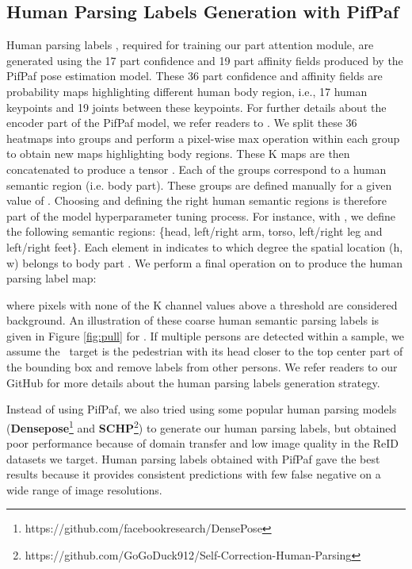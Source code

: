 \documentclass[10pt,twocolumn,letterpaper]{article}
\begin{document}
\subsection*{Human Parsing Labels Generation with PifPaf}
Human parsing labels , required for training our part attention module, are generated using the 17 part confidence and 19 part affinity fields produced by the PifPaf \cite{pifpaf} pose estimation model.
These 36 part confidence and affinity fields are probability maps highlighting different human body region, i.e., 17 human keypoints and 19 joints between these keypoints.
For further details about the encoder part of the PifPaf model, we refer readers to \cite{pifpaf}.
We split these 36 heatmaps into  groups and perform a pixel-wise max operation within each group to obtain  new maps highlighting  body regions.
These K maps are then concatenated to produce a tensor   .
Each of the  groups correspond to a human semantic region (i.e. body part).
These groups are defined manually for a given value of .
Choosing  and defining the right human semantic regions is therefore part of the model hyperparameter tuning process.
For instance, with , we define the following semantic regions: \{head, left/right arm, torso, left/right leg and left/right feet\}.
Each element  in  indicates to which degree the spatial location (h, w) belongs to body part .
We perform a final  operation on  to produce the human parsing label map:
{\small{

}}
where pixels with none of the K channel values above a threshold  are considered background. 
An illustration of these coarse human semantic parsing labels is given in Figure \ref{fig:pull} for .
If multiple persons are detected within a sample, we assume the \reid\ target is the pedestrian with its head closer to the top center part of the bounding box and remove labels from other persons.
We refer readers to our GitHub for more details about the human parsing labels generation strategy.

Instead of using PifPaf, we also tried using some popular human parsing models (\textbf{Densepose}\footnote{https://github.com/facebookresearch/DensePose} and \textbf{SCHP}\footnote{https://github.com/GoGoDuck912/Self-Correction-Human-Parsing}) to generate our human parsing labels, but obtained poor performance because of domain transfer and low image quality in the ReID datasets we target. Human parsing labels obtained with PifPaf gave the best results because it provides consistent predictions with few false negative on a wide range of image resolutions.
\end{document}
